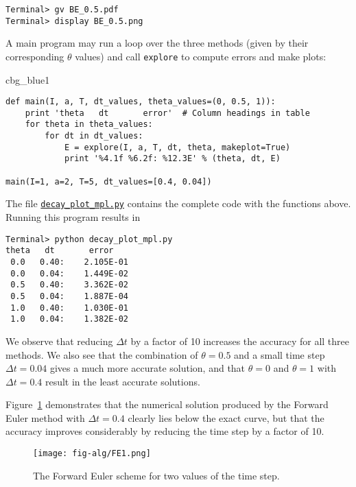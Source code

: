 \documentclass[graybox,sectrefs,envcountresetchap,open=right,final]{svmonodo}
\newenvironment{_cod_tight}[1]{
   \def\FrameCommand{\colorbox{#1}}
   \FrameRule0.6pt\MakeFramed {\FrameRestore}\vskip3mm}
   {\vskip0mm\endMakeFramed}
\newenvironment{cod}[1]{
\bgroup\rmfamily
\fboxsep=0mm\relax
\begin{_cod_tight}{#1}
\list{}{\parsep=-2mm\parskip=0mm\topsep=0pt\leftmargin=2mm
\rightmargin=2\leftmargin\leftmargin=4pt\relax}
\item\relax}
{\endlist\end{_cod_tight}\egroup}
\begin{document}
\begin{Verbatim}[frame=lines,label=\fbox{{\tiny Terminal}},framesep=2.5mm,framerule=0.7pt,fontsize=\fontsize{9pt}{9pt}]
Terminal> gv BE_0.5.pdf
Terminal> display BE_0.5.png
\end{Verbatim}

A main program may run a loop over the three methods (given by
their corresponding $\theta$ values)
and call \texttt{explore} to compute errors and make plots:

\begin{cod}{cbg_blue1}\begin{Verbatim}[numbers=none,fontsize=\fontsize{9pt}{9pt},baselinestretch=0.95,xleftmargin=2mm]
def main(I, a, T, dt_values, theta_values=(0, 0.5, 1)):
    print 'theta   dt       error'  # Column headings in table
    for theta in theta_values:
        for dt in dt_values:
            E = explore(I, a, T, dt, theta, makeplot=True)
            print '%4.1f %6.2f: %12.3E' % (theta, dt, E)

main(I=1, a=2, T=5, dt_values=[0.4, 0.04])
\end{Verbatim}
\end{cod}
\noindent
The file \href{{http://tinyurl.com/ofkw6kc/alg/decay_plot_mpl.py}}{\nolinkurl{decay_plot_mpl.py}}
contains the complete code with the functions above.
Running this program results in

\begin{Verbatim}[frame=lines,label=\fbox{{\tiny Terminal}},framesep=2.5mm,framerule=0.7pt,fontsize=\fontsize{9pt}{9pt}]
Terminal> python decay_plot_mpl.py
theta   dt       error
 0.0   0.40:    2.105E-01
 0.0   0.04:    1.449E-02
 0.5   0.40:    3.362E-02
 0.5   0.04:    1.887E-04
 1.0   0.40:    1.030E-01
 1.0   0.04:    1.382E-02
\end{Verbatim}
We observe that reducing $\Delta t$ by a factor of 10 increases the
accuracy for all three methods. We also see that
the combination of $\theta=0.5$ and a small time step $\Delta t =0.04$
gives a much more accurate solution, and that $\theta=0$ and $\theta=1$
with $\Delta t = 0.4$ result in the least accurate solutions.

Figure~\ref{decay:fig:FE1} demonstrates that the numerical solution
produced by the Forward Euler method with
$\Delta t=0.4$ clearly lies below the exact curve, but that the
accuracy improves considerably by reducing the time step by a factor
of 10.


\begin{figure}[!ht]  %
  \centerline{\texttt{[image: fig-alg/FE1.png]}}
  \caption{
  The Forward Euler scheme for two values of the time step. \label{decay:fig:FE1}
  }
\end{figure}
\end{document}
